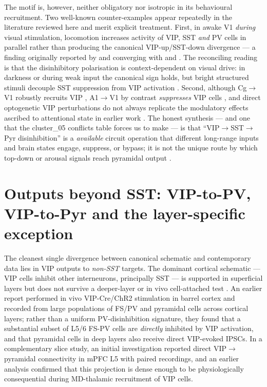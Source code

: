 \documentclass[11pt]{article}
\let\origrightarrow\rightarrow
\def\rightarrow{\ensuremath{\origrightarrow}}
\begin{document}
The motif is, however, neither obligatory nor isotropic in its behavioural recruitment. Two well-known counter-examples appear repeatedly in the literature reviewed here and merit explicit treatment. First, in awake V1 \textit{during} visual stimulation, locomotion increases activity of VIP, SST \textit{and} PV cells in parallel rather than producing the canonical VIP-up/SST-down divergence --- a finding originally reported by \citet{Pakan2016} and converging with \citet{Dipoppa2018} and \citet{Kaneko2024}. The reconciling reading is that the disinhibitory polarisation is context-dependent on visual drive: in darkness or during weak input the canonical sign holds, but bright structured stimuli decouple SST suppression from VIP activation \citep{Pakan2016, Dipoppa2018, Kaneko2024, Sabri2024}. Second, although Cg\rightarrow V1 robustly recruits VIP \citep{Zhang2014}, A1\rightarrow V1 by contrast \textit{suppresses} VIP cells \citep{Ibrahim2016}, and direct optogenetic VIP perturbations do not always replicate the modulatory effects ascribed to attentional state in earlier work \citep{Ibrahim2016, Sabri2024, Anastasiades2021a}. The honest synthesis --- and one that the cluster\_05 conflicts table forces us to make --- is that ``VIP\rightarrow SST\rightarrow Pyr disinhibition'' is a \textit{available} circuit operation that different long-range inputs and brain states engage, suppress, or bypass; it is not the unique route by which top-down or arousal signals reach pyramidal output \citep{Pakan2016, Dipoppa2018, Ibrahim2016, Anastasiades2021a, Kaneko2024, Sabri2024}.

\section{Outputs beyond SST: VIP-to-PV, VIP-to-Pyr and the layer-specific exception}

The cleanest single divergence between canonical schematic and contemporary data lies in VIP outputs to \textit{non-SST} targets. The dominant cortical schematic --- VIP cells inhibit other interneurons, principally SST --- is supported in superficial layers but does not survive a deeper-layer or in vivo cell-attached test \citep{Yu2019, Zhou2017, Anastasiades2021a, Walker2016}. An earlier report performed in vivo VIP-Cre/ChR2 stimulation in barrel cortex and recorded from large populations of FS/PV and pyramidal cells across cortical layers; rather than a uniform PV-disinhibition signature, they found that a substantial subset of L5/6 FS-PV cells are \textit{directly} inhibited by VIP activation, and that pyramidal cells in deep layers also receive direct VIP-evoked IPSCs. In a complementary slice study, an initial investigation reported direct VIP\rightarrow pyramidal connectivity in mPFC L5 with paired recordings, and an earlier analysis confirmed that this projection is dense enough to be physiologically consequential during MD-thalamic recruitment of VIP cells.
\end{document}
